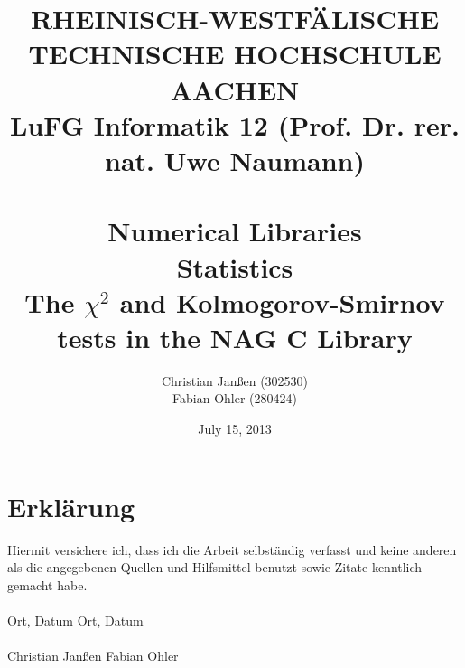 \documentclass{article}
\title{
{\bf \scriptsize RHEINISCH-WESTF\"ALISCHE TECHNISCHE HOCHSCHULE AACHEN \\
LuFG Informatik 12 (Prof. Dr. rer. nat. Uwe Naumann)}
\vspace{.5cm} \\
\epsfig{file=figures/STCE_Logo_WWW.eps,width=.7\textwidth}
\vspace{1cm} \\
{\bf \Large Numerical Libraries} \\
{\bf \large Statistics} \\
{\large The $\chi^2$ and Kolmogorov-Smirnov tests in the NAG C Library}
}
\author{Christian Janßen (302530) \\ Fabian Ohler (280424) }
\date{July 15, 2013}
\theoremstyle{definition}
\begin{document}

\begin{titlepage}
\clearpage
\maketitle
\thispagestyle{empty}
\end{titlepage}

\section*{Erkl\"arung}

Hiermit versichere ich, dass ich die Arbeit selbst\"andig verfasst und keine
anderen als die angegebenen Quellen und Hilfsmittel benutzt sowie Zitate 
kenntlich gemacht habe.
\\
\vspace{10ex}
\\
Ort, Datum \hfill Ort, Datum
\\
\vspace{10ex}
\\
Christian Janßen \hfill Fabian Ohler

\newpage

\tableofcontents

\pagestyle{headings}
\newpage
\end{document}

